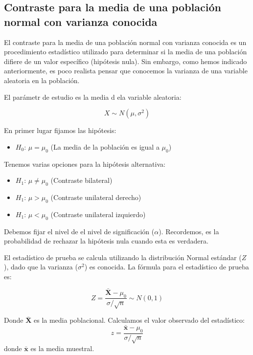 \documentclass[
  letterpaper,
  DIV=11,
  numbers=noendperiod]{scrreprt}
\providecommand{\tightlist}{%
  \setlength{\itemsep}{0pt}\setlength{\parskip}{0pt}}\usepackage{longtable,booktabs,array}
\begin{document}
\hypertarget{contraste-para-la-media-de-una-poblaciuxf3n-normal-con-varianza-conocida}{%
\subsection{Contraste para la media de una población normal con varianza
conocida}\label{contraste-para-la-media-de-una-poblaciuxf3n-normal-con-varianza-conocida}}

El contraste para la media de una población normal con varianza conocida
es un procedimiento estadístico utilizado para determinar si la media de
una población difiere de un valor específico (hipótesis nula). Sin
embargo, como hemos indicado anteriormente, es poco realista pensar que
conocemos la varianza de una variable aleatoria en la población.

El parámetr de estudio es la media d ela variable aleatoria:

\[ X \sim N(\mu,\sigma^2) \]

En primer lugar fijamos las hipótesis:

\begin{itemize}
\tightlist
\item
  \(H_0\): \(\mu = \mu_0\) (La media de la población es igual a
  \(\mu_0\))
\end{itemize}

Tenemos varias opciones para la hipótesis alternativa:

\begin{itemize}
\tightlist
\item
  \(H_1\): \(\mu \neq \mu_0\) (Contraste bilateral)
\item
  \(H_1\): \(\mu > \mu_0\) (Contraste unilateral derecho)
\item
  \(H_1\): \(\mu < \mu_0\) (Contraste unilateral izquierdo)
\end{itemize}

Debemos fijar el nivel de el nivel de significación (\(\alpha\)).
Recordemos, es la probabilidad de rechazar la hipótesis nula cuando esta
es verdadera.

El estadístico de prueba se calcula utilizando la distribución Normal
estándar (\(Z\)), dado que la varianza (\(\sigma^2\)) es conocida. La
fórmula para el estadístico de prueba es:

\[ Z = \frac{\bar{\mathbf{X}} - \mu_0}{\sigma/\sqrt{n}} \sim N(0,1) \]

Donde \(\bar{\mathbf{X}}\) es la media poblacional. Calculamos el valor
observado del estadístico:
\[ z = \frac{\bar{\mathbf{x}} - \mu_0}{\sigma/\sqrt{n}} \] donde
\(\bar{\mathbf{x}}\) es la media muestral.
\end{document}
